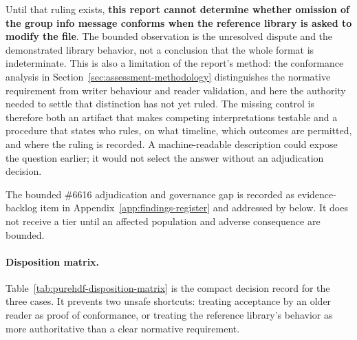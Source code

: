 \documentclass[../main.tex]{subfiles}
\begin{document}
Until that ruling exists, \textbf{this report cannot determine whether omission
of the group info message conforms when the reference library is asked to
modify the file}. The bounded observation is the unresolved dispute and the
demonstrated library behavior, not a conclusion that the whole format is
indeterminate. This is also a limitation of the report's method: the conformance
analysis in Section~\ref{sec:assessment-methodology} distinguishes the
normative requirement from writer behaviour and reader validation, and here the
authority needed to settle that distinction has not yet ruled. The missing
control is therefore both an artifact that makes competing interpretations
testable and a procedure that states who rules, on what timeline, which
outcomes are permitted, and where the ruling is recorded. A machine-readable
description could expose the question earlier; it would not select the answer
without an adjudication decision.

The bounded \#6616 adjudication and governance gap is recorded as
evidence-backlog item  in
Appendix~\ref{app:findings-register} and addressed by  below. It
does not receive a tier until an affected population and adverse consequence
are bounded.

\paragraph{Disposition matrix.}
Table~\ref{tab:purehdf-disposition-matrix} is the compact decision record for
the three cases. It prevents two unsafe shortcuts: treating acceptance by an
older reader as proof of conformance, or treating the reference library's
behavior as more authoritative than a clear normative requirement.
\end{document}
